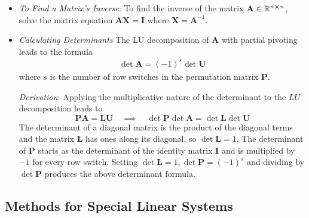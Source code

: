 \documentclass[11pt, a4paper]{article}
\newcommand{\R}{\mathbb{R}} %
\newcommand{\mat}[1]{\mathbf{#1}} %
\begin{document}
\begin{itemize}
\begin{enumerate}
	\end{enumerate}
	
	\item \textit{To Find a Matrix's Inverse}: To find the inverse of the matrix $ \mat{A} \in \R^{n \cross n}$, solve the matrix equation $ \mat{A} \mat{X} = \mat{I} $ where  $ \mathbf{X} = \mat{A}^{-1} $.
	
	\item \textit{Calculating Determinants} The LU decomposition of $ \mat{A} $ with partial pivoting leads to the formula
	\begin{align*}
		\det \mat{A} = (-1)^{s} \det \mat{U}
	\end{align*}
	where $ s $ is the number of row switches in the permutation matrix $ \mathbf{P} $.
	
	\textit{Derivation}: Applying the multiplicative nature of the determinant to the $ LU $ decomposition leads to
	\begin{equation*}
		\mathbf{P} \mat{A} = \mat{L} \mat{U} \quad \implies \quad \det \mathbf{P} \det \mat{A} = \det \mat{L} \det \mat{U}
	\end{equation*}
	The determinant of a diagonal matrix is the product of the diagonal terms and the matrix $ \mat{L} $ has ones along its diagonal, so $ \det \mat{L} = 1 $. The determinant of $ \mathbf{P} $ starts as the determinant of the identity matrix $ \mathbf{I} $ and is multiplied by $ -1 $ for every row switch. Setting $ \det \mat{L} = 1, \det \mathbf{P} = (-1)^s $ and dividing  by $ \det \mathbf{P} $ produces the above determinant formula.
\end{itemize}




\subsection{Methods for Special Linear Systems}
\end{document}
